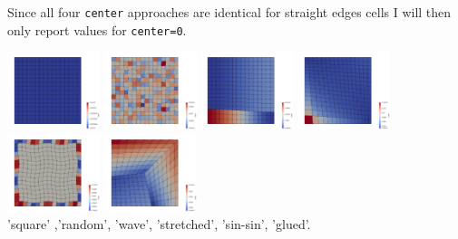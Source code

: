 Since all four \lstinline{center} approaches are identical for straight edges
cells I will then only report values for \lstinline{center=0}. 



\begin{center}
\includegraphics[width=2.7cm]{python_codes/fieldstone_76/results/mt1}
\includegraphics[width=2.7cm]{python_codes/fieldstone_76/results/mt2}
\includegraphics[width=2.7cm]{python_codes/fieldstone_76/results/mt3}
\includegraphics[width=2.7cm]{python_codes/fieldstone_76/results/mt4}
\includegraphics[width=2.7cm]{python_codes/fieldstone_76/results/mt5}
\includegraphics[width=2.7cm]{python_codes/fieldstone_76/results/mt6}\\
{\captionfont 'square' ,'random', 'wave', 'stretched', 'sin-sin', 'glued'.}
\end{center}


